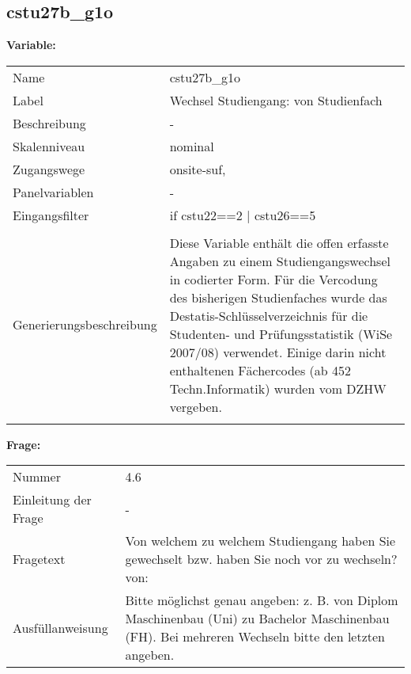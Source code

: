 	
	
	\subsection{cstu27b\_g1o}
	\label{subSection:cstu27b_g1o}

	\noindent\textbf{Variable:}\\
		\begin{tabular}{lL{11.3cm}}
			\label{tableVariable:cstu27b_g1o}
			Name & cstu27b\_g1o \\
			Label & Wechsel Studiengang: von Studienfach \\
			Beschreibung & - \\
			Skalenniveau & nominal \\
			Zugangswege &
				onsite-suf,
 \\
			Panelvariablen & -
			 \\
			Eingangsfilter & if cstu22==2 | cstu26==5 \\
 \\
					Generierungsbeschreibung & Diese Variable enthält die offen erfasste Angaben zu einem Studiengangswechsel in codierter Form. Für die Vercodung des bisherigen Studienfaches wurde das Destatis-Schlüsselverzeichnis für die Studenten- und Prüfungsstatistik (WiSe 2007/08) verwendet. Einige darin nicht enthaltenen Fächercodes (ab 452 Techn.Informatik) wurden vom DZHW vergeben.
				 \\	
			 \\
		\end{tabular}

		\vspace*{1 cm}
		\noindent\textbf{Frage:}\\
		\begin{tabular}{lL{11.3cm}}
			\label{tableQuestion:cstu27b_g1o}
			Nummer & 4.6 \\
			Einleitung der Frage & - \\
			Fragetext & Von welchem zu welchem Studiengang haben Sie gewechselt bzw. haben Sie noch vor zu wechseln?
von: \\
			Ausfüllanweisung & Bitte möglichst genau angeben: z. B. von Diplom Maschinenbau
(Uni) zu Bachelor Maschinenbau (FH).
Bei mehreren Wechseln bitte den letzten angeben. \\
		\end{tabular}





